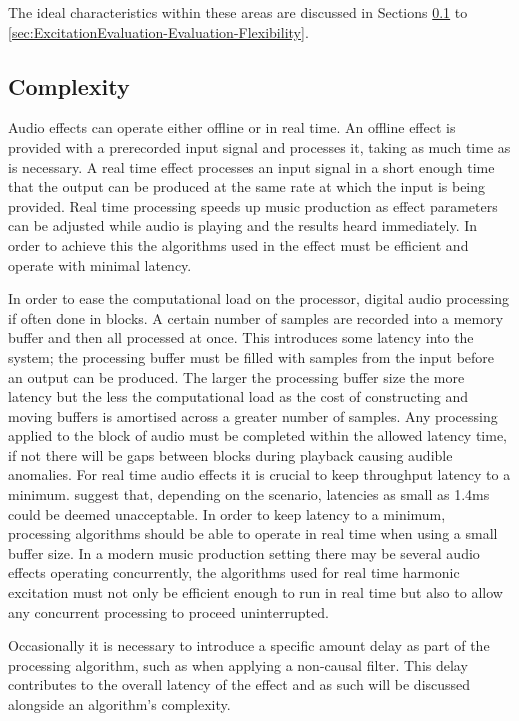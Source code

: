 	The ideal characteristics within these areas are discussed in Sections
	\ref{sec:ExcitationEvaluation-Evaluation-Complexity} to \ref{sec:ExcitationEvaluation-Evaluation-Flexibility}.

	\subsection{Complexity}
	\label{sec:ExcitationEvaluation-Evaluation-Complexity}
		Audio effects can operate either offline or in real time. An offline effect is provided with a prerecorded
		input signal and processes it, taking as much time as is necessary. A real time effect processes an input
		signal in a short enough time that the output can be produced at the same rate at which the input is being
		provided. Real time processing speeds up music production as effect parameters can be adjusted while audio
		is playing and the results heard immediately. In order to achieve this the algorithms used in the effect
		must be efficient and operate with minimal latency. 

		In order to ease the computational load on the processor, digital audio processing if often done in blocks.
		A certain number of samples are recorded into a memory buffer and then all processed at once. This
		introduces some latency into the system; the processing buffer must be filled with samples from the input
		before an output can be produced. The larger the processing buffer size the more latency but the less the
		computational load as the cost of constructing and moving buffers is amortised across a greater number of
		samples. Any processing applied to the block of audio must be completed within the allowed latency time, if
		not there will be gaps between blocks during playback causing audible anomalies. For real time audio effects
		it is crucial to keep throughput latency to a minimum. \citet{lester2007the} suggest that, depending on the
		scenario, latencies as small as 1.4ms could be deemed unacceptable. In order to keep latency to a minimum,
		processing algorithms should be able to operate in real time when using a small buffer size. In a modern
		music production setting there may be several audio effects operating concurrently, the algorithms used for
		real time harmonic excitation must not only be efficient enough to run in real time but also to allow any
		concurrent processing to proceed uninterrupted.

		Occasionally it is necessary to introduce a specific amount delay as part of the processing algorithm, such
		as when applying a non-causal filter. This delay contributes to the overall latency of the effect and as
		such will be discussed alongside an algorithm's complexity.

